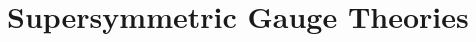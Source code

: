 \documentclass[11pt,a4paper]{article}
\makeatletter
\numberwithin{equation}{subsection}
\newcommand{\checklabel}[2]{%
  \begingroup
  \def\@currentlabel{#2}%
  \label{#1}%
  \endgroup
}
\makeatother
\begin{document}
\setcounter{section}{26}
\section{Supersymmetric Gauge Theories}
\setcounter{subsection}{5}

\checklabel{eq:27.2.7}{27.2.7}
\checklabel{eq:27.2.18}{27.2.18}
\checklabel{eq:27.3.12}{27.3.12}
\checklabel{ch27-ref-3}{3}
\checklabel{ch27-ref-5}{5}
\checklabel{ch27-ref-6}{6}
\checklabel{ch27-ref-7}{7}


\end{document}
